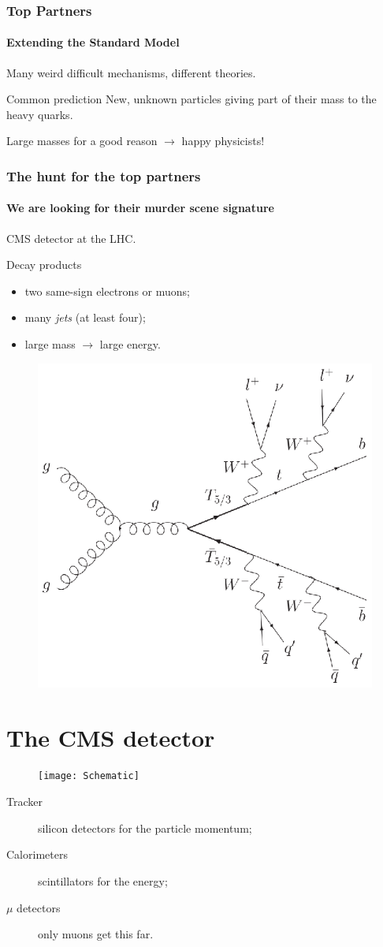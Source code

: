 \documentclass[ukenglish]{beamer}
\begin{document}
\begin{frame}
    \frametitle{Top Partners}
    \framesubtitle{Extending the Standard Model}

    Many weird difficult mechanisms, different theories. 
    \begin{block}
        {Common prediction}
        New, unknown particles giving part of their mass to the heavy
        quarks.
    \end{block}
    Large masses for a good reason $\longrightarrow$ happy physicists!
\end{frame}

\begin{frame}
    \frametitle{The hunt for the top partners}
    \framesubtitle{We are looking for their murder scene signature}
    CMS detector at the LHC.
    \begin{block}
        {Decay products}
        \begin{itemize}
            \item two same-sign electrons or muons;
            \item many \emph{jets} (at least four);
            \item large mass $\rightarrow$ large energy.
        \end{itemize}
    \end{block}
    \begin{figure}[h]
        \centering
            \includegraphics[width=.4\textwidth]{toppartner_decay}
    \end{figure}
\end{frame}

\section{The CMS detector}
\begin{frame}
    \begin{figure}[h]
        \centering
            \texttt{[image: Schematic]}
    \end{figure}
    \begin{description}
        \item[Tracker] silicon detectors for the particle momentum;
        \item[Calorimeters] scintillators for the energy;
        \item[$\mu$ detectors] only muons get this far.
    \end{description}
\end{frame}
\end{document}
